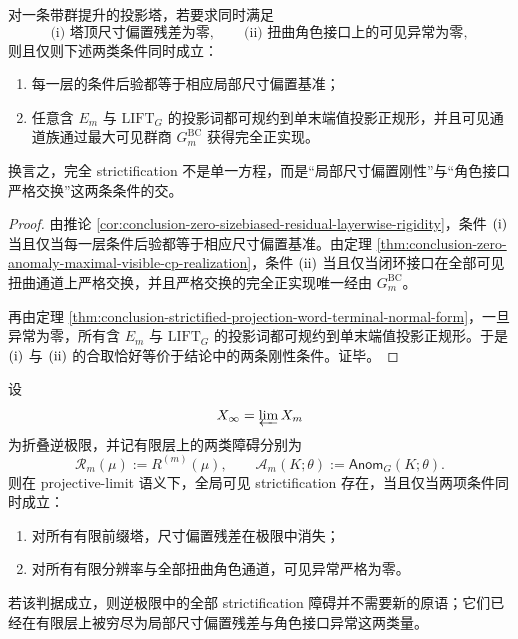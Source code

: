 \begin{theorem}\label{thm:conclusion-complete-strictification-dual-criterion}
对一条带群提升的投影塔，若要求同时满足
\[
\text{(i) 塔顶尺寸偏置残差为零},
\qquad
\text{(ii) 扭曲角色接口上的可见异常为零},
\]
则且仅则下述两类条件同时成立：
\begin{enumerate}
  \item 每一层的条件后验都等于相应局部尺寸偏置基准；
  \item 任意含 \(E_m\) 与 \(\mathrm{LIFT}_G\) 的投影词都可规约到单末端值投影正规形，并且可见通道族通过最大可见群商 \(G_m^{\mathrm{BC}}\) 获得完全正实现。
\end{enumerate}
换言之，完全 strictification 不是单一方程，而是“局部尺寸偏置刚性”与“角色接口严格交换”这两条条件的交。
\end{theorem}
\begin{proof}
由推论 \ref{cor:conclusion-zero-sizebiased-residual-layerwise-rigidity}，条件 \(\textup{(i)}\) 当且仅当每一层条件后验都等于相应尺寸偏置基准。由定理 \ref{thm:conclusion-zero-anomaly-maximal-visible-cp-realization}，条件 \(\textup{(ii)}\) 当且仅当闭环接口在全部可见扭曲通道上严格交换，并且严格交换的完全正实现唯一经由 \(G_m^{\mathrm{BC}}\)。

再由定理 \ref{thm:conclusion-strictified-projection-word-terminal-normal-form}，一旦异常为零，所有含 \(E_m\) 与 \(\mathrm{LIFT}_G\) 的投影词都可规约到单末端值投影正规形。于是 \(\textup{(i)}\) 与 \(\textup{(ii)}\) 的合取恰好等价于结论中的两条刚性条件。证毕。
\end{proof}

\begin{conjecture}\label{conj:conclusion-inverse-limit-strictification-dual-obstruction-completeness}
设
\[
X_\infty=\varprojlim X_m
\]
为折叠逆极限，并记有限层上的两类障碍分别为
\[
\mathcal R_m(\mu):=R^{(m)}(\mu),
\qquad
\mathcal A_m(K;\theta):=\mathsf{Anom}_G(K;\theta).
\]
则在 projective-limit 语义下，全局可见 strictification 存在，当且仅当两项条件同时成立：
\begin{enumerate}
  \item 对所有有限前缀塔，尺寸偏置残差在极限中消失；
  \item 对所有有限分辨率与全部扭曲角色通道，可见异常严格为零。
\end{enumerate}
若该判据成立，则逆极限中的全部 strictification 障碍并不需要新的原语；它们已经在有限层上被穷尽为局部尺寸偏置残差与角色接口异常这两类量。
\end{conjecture}
